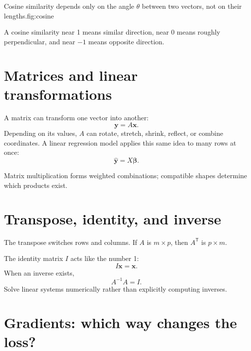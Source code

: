 \begin{utpfig}{Cosine similarity depends only on the angle $\theta$ between two vectors, not on their lengths.}{fig:cosine}
\end{utpfig}

A cosine similarity near 1 means similar direction, near 0 means roughly perpendicular, and near $-1$ means opposite direction.

\section{Matrices and linear transformations}

A matrix can transform one vector into another:
\[
  \bm{y}=A\bm{x}.
\]
Depending on its values, $A$ can rotate, stretch, shrink, reflect, or combine coordinates. A linear regression model applies this same idea to many rows at once:
\[
  \hat{\bm{y}}=X\bm{\beta}.
\]

\begin{intuition}
Matrix multiplication forms weighted combinations; compatible shapes determine which products exist.
\end{intuition}

\section{Transpose, identity, and inverse}

The transpose switches rows and columns. If $A$ is $m\times p$, then $A^{\mathsf T}$ is $p\times m$.

The identity matrix $I$ acts like the number 1:
\[
  I\bm{x}=\bm{x}.
\]
When an inverse exists,
\[
  A^{-1}A=I.
\]
Solve linear systems numerically rather than explicitly computing inverses.

\section{Gradients: which way changes the loss?}

